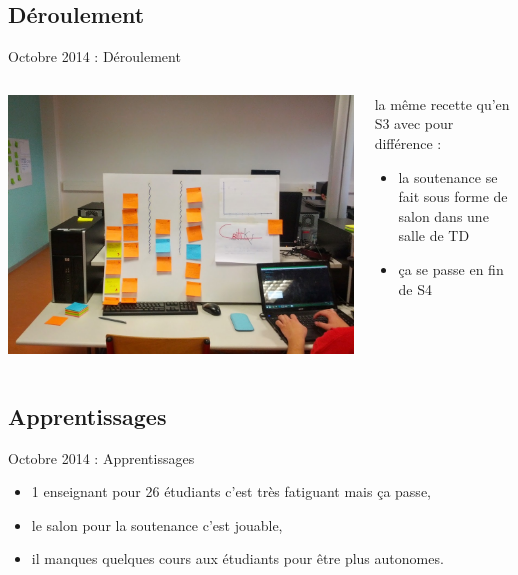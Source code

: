 \documentclass{beamer}
\begin{document}
\subsection{Déroulement}
\begin{frame}{Octobre 2014 : Déroulement }
  \begin{columns}
    \begin{column}{0.5\textwidth}
      \begin{center}
        \includegraphics[width=\textwidth]{includes/201410_dashboard.jpg}      
      \end{center}
    \end{column}
    \begin{column}{0.5\textwidth}
      la même recette qu'en S3 avec pour différence : 
      \begin{itemize}
        \item la soutenance se fait sous forme de salon dans une salle de TD
        \item ça se passe en fin de S4
      \end{itemize}
    \end{column}
  \end{columns}
\end{frame}

\subsection{Apprentissages}
\begin{frame}{Octobre 2014 : Apprentissages}
  \begin{itemize}
    \item 1 enseignant pour 26 étudiants c'est très fatiguant mais ça passe,
    \item le salon pour la soutenance c'est jouable,
    \item il manques quelques cours aux étudiants pour être plus autonomes.
  \end{itemize}
\end{frame}
\end{document}
